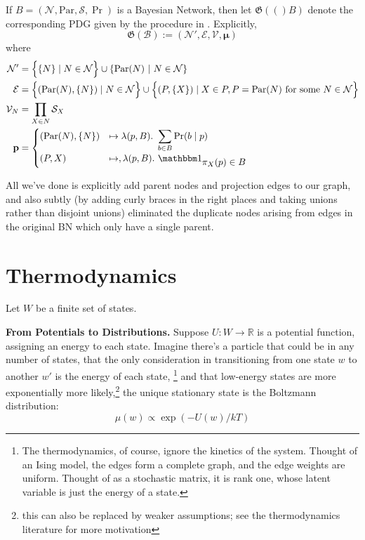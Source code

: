 \documentclass{article}
\theoremstyle{plain}
\theoremstyle{definition}
\theoremstyle{remark}
\newcommand{\bmu}{\boldsymbol{\mu}}
\newcommand{\Ed}{\mathcal E}
\newcommand{\dg}[1]{\mathfrak{#1}}
\newcommand{\PDGof}[1]{\dg G(#1)}
\numberwithin{equation}{section}
\begin{document}
{	
	\begin{defn} \label{def:bnconvert-formal}
		If $B = (\mathcal N, \mathrm{Par}, \mathcal S, \Pr)$ is a Bayesian Network, then let $\PDGof (B)$ denote the corresponding PDG given by the procedure in . Explicitly, 
		\[ \PDGof{{\mathcal B}} :=  (\mathcal N', \Ed, \mathcal V,
                \bmu) \] 
		where %
		\begin{align*}
		\mathcal N' &=  \left\{ \Big.\{N\} \mid N \in \mathcal N\right\} \cup \left\{ \mathrm{Par}(N) ~\middle|~ N \in \cal N \right\} \\%
		\Ed &= \left\{ \vphantom{\Big|}(\mathrm{Par}(N), \{N\}) \mid N \in \mathcal N \right\} \cup 
		\left\{\vphantom{\Big|} (P, \{X\}) \mid X \in P, P = \mathrm{Par}(N) \text{ for some }N \in \mathcal N \right\} \\
		\mathcal V_N &= \prod_{X \in N} \mathcal S_X \\
		\mathbf p &= \begin{cases}
		(\mathrm{Par}(N), \{N\}) &\mapsto \lambda(p, B).~ \displaystyle\sum_{b \in  B} \Pr(b \mid p) \\
		(P, X) &\mapsto, \lambda (p, B).~ \displaystyle \mathbbm 1_{\displaystyle\pi_X(p) \in B}
		\end{cases}
		\end{align*}
	\end{defn}
	All we've done is explicitly add parent nodes and projection edges to our graph, and also subtly (by adding curly braces in the right places and taking unions rather than disjoint unions) eliminated the duplicate nodes arising from edges in the original BN which only have a single parent.
	
	\section{Thermodynamics}\label{sec:thermo-background}
	Let $W$ be a finite set of states.
	
	\textbf{From Potentials to Distributions.}
	Suppose $U: W \to \mathbb R$ is a potential function, assigning an energy to each state. Imagine there's a particle that could be in any number of states, that the only consideration in transitioning from one state $w$ to another $w'$ is the energy of each state,%
		\footnote{The thermodynamics, of course, ignore the kinetics of the system. Thought of an Ising model, the edges form a complete graph, and the edge weights are uniform. Thought of as a stochastic matrix, it is rank one, whose latent variable is just the energy of a state.}
	and that low-energy states are more exponentially more likely,\footnote{this can also be replaced by weaker assumptions; see the thermodynamics literature for more motivation}
	the unique stationary state is the Boltzmann distribution:
	\begin{equation}
		 \mu(w) \propto \exp( - U(w) / kT ) \label{eq:boltzmann-appendix}
	\end{equation}

}
\end{document}
